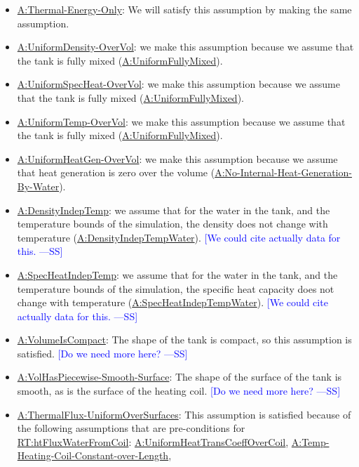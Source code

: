 \documentclass[12pt]{article}
\newcommand{\authornote}[3]{\textcolor{#1}{[#3 ---#2]}}
\newcommand{\authornote}[3]{}
\newcommand{\wss}[1]{\authornote{blue}{SS}{#1}}
\begin{document}
\begin{itemize}
\item \hyperref[assumpTEO]{A:Thermal-Energy-Only}: We will satisfy this
assumption by making the same assumption.
\item \hyperref[assumpUnifDens]{A:UniformDensity-OverVol}: we make this
assumption because we assume that the tank is fully mixed
(\hyperref[assumpFullyMixed]{A:UniformFullyMixed}).
\item \hyperref[assumpUnifSpecHeat]{A:UniformSpecHeat-OverVol}: we make this
assumption because we assume that the tank is fully mixed
(\hyperref[assumpFullyMixed]{A:UniformFullyMixed}).
\item \hyperref[assumpUnifTemp]{A:UniformTemp-OverVol}: we make this assumption
because we assume that the tank is fully mixed
(\hyperref[assumpFullyMixed]{A:UniformFullyMixed}).
\item \hyperref[assumpUnifHeatGen]{A:UniformHeatGen-OverVol}: we make this
assumption because we assume that heat generation is zero over the volume
(\hyperref[assumpNIHGBW]{A:No-Internal-Heat-Generation-By-Water}).
\item \hyperref[assumpDensIndepT]{A:DensityIndepTemp}: we assume that for the water in the tank, and the temperature bounds of the simulation, the density does not change with temperature (\hyperref[assumpDensIndepTWater]{A:DensityIndepTempWater}).  \wss{We could cite actually data for this.}
\item \hyperref[assumpSpecHeatIndepT]{A:SpecHeatIndepTemp}: we assume that for
the water in the tank, and the temperature bounds of the simulation, the
specific heat capacity does not change with temperature
(\hyperref[assumpSpecHeatIndepTWater]{A:SpecHeatIndepTempWater}).  \wss{We could
cite actually data for this.}
\item \hyperref[assumpPiecewiseSmooth]{A:VolumeIsCompact}: The shape of the tank
is compact, so this assumption is satisfied.  \wss{Do we need more here?}
\item \hyperref[assumpPiecewiseSmooth]{A:VolHasPiecewise-Smooth-Surface}: The
shape of the surface of the tank is smooth, as is the surface of the heating
coil.  \wss{Do we need more here?}
\item \hyperref[assumpUnifThermFlux]{A:ThermalFlux-UniformOverSurfaces}: This
assumption is satisfied because of the following assumptions that are
pre-conditions for \hyperref[RT:htFluxWaterFromCoil]{RT:htFluxWaterFromCoil}:
\hyperref[assumpUnifHeatTransCoeffCoil]{A:UniformHeatTransCoeffOverCoil},
\hyperref[assumpTHCCoL]{A:Temp-Heating-Coil-Constant-over-Length},

\end{itemize}
\end{document}
